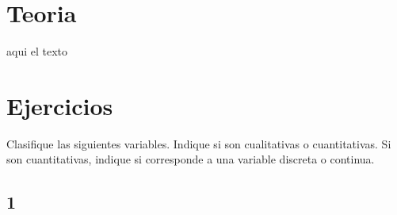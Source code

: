 \documentclass{templateNote}
\begin{document}
\portada
\margenes %


\section{Teoria}
\indent
aqui el texto

\newpage
\section{Ejercicios}
Clasifique las siguientes variables. Indique si son cualitativas o cuantitativas. Si son cuantitativas, indique si corresponde a una variable discreta o continua.
\subsection{1}
\end{document}
